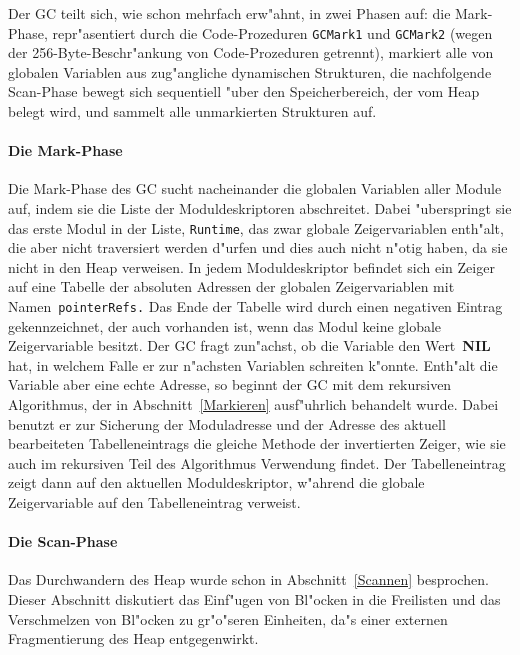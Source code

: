 Der GC teilt sich, wie schon mehrfach erw"ahnt, in zwei Phasen auf: die
Mark-Phase, repr"asentiert durch die Code-Prozeduren {\tt GCMark1} und
{\tt GCMark2} (wegen der 256-Byte-Beschr"ankung von Code-Prozeduren getrennt),
markiert alle von globalen Variablen aus zug"angliche dynamischen Strukturen,
die nachfolgende Scan-Phase bewegt sich sequentiell "uber den Speicherbereich,
der vom Heap belegt wird, und sammelt alle unmarkierten Strukturen auf.

\paragraph{Die Mark-Phase}

Die Mark-Phase des GC sucht nacheinander die globalen Variablen aller
Module auf, indem sie die Liste der Moduldeskriptoren abschreitet.
Dabei "uberspringt sie das erste Modul in der Liste, {\tt Runtime},
das zwar globale Zeigervariablen enth"alt, die aber nicht traversiert
werden d"urfen und dies auch nicht n"otig haben, da sie nicht in den
Heap verweisen.
In jedem Moduldeskriptor befindet sich ein Zeiger auf eine Tabelle
der absoluten Adressen der globalen Zeigervariablen mit Namen~{\tt pointerRefs.}
Das Ende der Tabelle wird durch einen negativen Eintrag gekennzeichnet, der
auch vorhanden ist, wenn das Modul keine globale Zeigervariable besitzt.
Der GC fragt zun"achst, ob die Variable den Wert~{\bf NIL} hat, in welchem Falle
er zur n"achsten Variablen schreiten k"onnte.
Enth"alt die Variable aber eine echte Adresse, so beginnt der GC mit dem
rekursiven Algorithmus, der in Abschnitt~\ref{Markieren} ausf"uhrlich
behandelt wurde.
Dabei benutzt er zur Sicherung der Moduladresse und der Adresse des aktuell
bearbeiteten Tabelleneintrags die gleiche Methode der invertierten Zeiger,
wie sie auch im rekursiven Teil des Algorithmus Verwendung findet.
Der Tabelleneintrag zeigt dann auf den aktuellen Moduldeskriptor, w"ahrend
die globale Zeigervariable auf den Tabelleneintrag verweist.

\paragraph{Die Scan-Phase}

Das Durchwandern des Heap wurde schon in Abschnitt~\ref{Scannen} besprochen.
Dieser Abschnitt diskutiert das Einf"ugen von Bl"ocken in die Freilisten und
das Verschmelzen von Bl"ocken zu gr"o"seren Einheiten, da"s einer externen
Fragmentierung des Heap entgegenwirkt.


